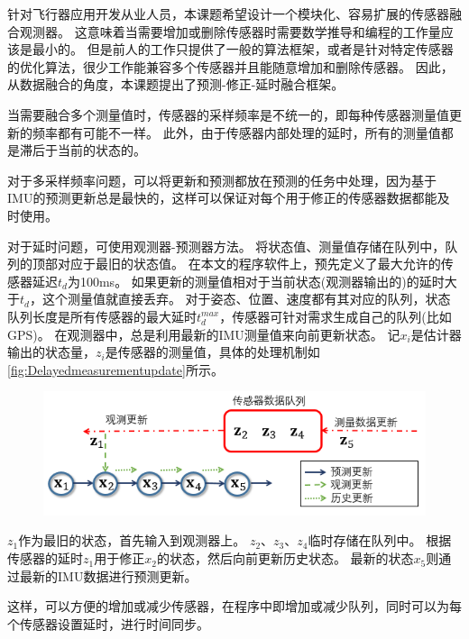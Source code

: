 \documentclass[
  type=master
]{gdutthesis}
\begin{document}
针对飞行器应用开发从业人员，本课题希望设计一个模块化、容易扩展的传感器融合观测器。
这意味着当需要增加或删除传感器时需要数学推导和编程的工作量应该是最小的。
但是前人的工作只提供了一般的算法框架，或者是针对特定传感器的优化算法，很少工作能兼容多个传感器并且能随意增加和删除传感器。
因此，从数据融合的角度，本课题提出了预测-修正-延时融合框架。

当需要融合多个测量值时，传感器的采样频率是不统一的，即每种传感器测量值更新的频率都有可能不一样。
此外，由于传感器内部处理的延时，所有的测量值都是滞后于当前的状态的。

对于多采样频率问题，可以将更新和预测都放在预测的任务中处理，因为基于IMU的预测更新总是最快的，这样可以保证对每个用于修正的传感器数据都能及时使用。

对于延时问题，可使用观测器-预测器方法\cite{khosravian2014velocity}。
将状态值、测量值存储在队列中，队列的顶部对应于最旧的状态值。
在本文的程序软件上，预先定义了最大允许的传感器延迟$t_d$为100ms。
如果更新的测量值相对于当前状态(观测器输出的)的延时大于$t_d$，这个测量值就直接丢弃。
对于姿态、位置、速度都有其对应的队列，状态队列长度是所有传感器的最大延时$t_d^{max}$，传感器可针对需求生成自己的队列(比如GPS)。
在观测器中，总是利用最新的IMU测量值来向前更新状态。
记$x_i$是估计器输出的状态量，$z_i$是传感器的测量值，具体的处理机制如\autoref{fig:Delayedmeasurementupdate}所示。
\begin{figure}[htbp]
	\centering
	\includegraphics[width=1.0\textwidth]{屏幕截图 2022-06-08 115635.png}
	\label{fig:Delayedmeasurementupdate}
\end{figure} 

$z_1$作为最旧的状态，首先输入到观测器上。
$z_2$、$z_3$、$z_4$临时存储在队列中。
根据传感器的延时$z_1$用于修正$x_2$的状态，然后向前更新历史状态。
最新的状态$x_5$则通过最新的IMU数据进行预测更新。

这样，可以方便的增加或减少传感器，在程序中即增加或减少队列，同时可以为每个传感器设置延时，进行时间同步。
\end{document}
